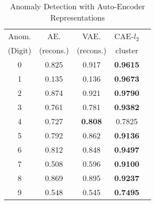 \documentclass[conference]{IEEEtran}
\begin{document}
\begin{table}[!t]

\caption{Anomaly Detection with Auto-Encoder Representations}
\label{anom2}
\centering
\begin{adjustbox}{width=0.35\textwidth}

\begin{tabular}{|c|c|c|c|c|}
\hline
Anom. & AE. & VAE. & CAE-$l_2$\\ 
(Digit) & (recons.) & (recons.) & cluster\\ 
\hline
0 & 0.825 & 0.917& \textbf{0.9615} \\
\hline
1 & 0.135 & 0.136& \textbf{0.9673}\\
\hline
2 & 0.874 & 0.921  & \textbf{0.9790}\\
\hline
3 & 0.761 & 0.781  & \textbf{0.9382}\\
\hline
4 & 0.727 & \textbf{0.808} &  0.7825\\
\hline
5 & 0.792 & 0.862 &  \textbf{0.9136}\\
\hline
6 & 0.812 & 0.848 & \textbf{0.9497}\\
\hline
7 & 0.508 & 0.596 &\textbf{0.9100}\\
\hline
8 & 0.869 & 0.895  & \textbf{0.9237}\\
\hline
9 & 0.548 & 0.545  & \textbf{0.7495}\\
\hline
\end{tabular}
\end{adjustbox}

\end{table}


%
%
\end{document}
